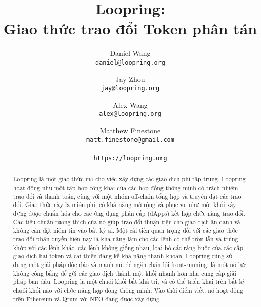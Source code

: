 \documentclass[12pt,a4paper]{article}
\title{\textbf{Loopring:}\\\textbf{Giao thức trao đổi Token phân tán}}
\author{
  Daniel Wang\\
  \texttt{daniel@loopring.org}\\
  \and
  	Jay Zhou\\
  	\texttt{jay@loopring.org}\\
  	\and
  	Alex Wang\\
  	\texttt{alex@loopring.org}\\
  	\and
  	Matthew Finestone\\
  	\texttt{matt.finestone@gmail.com}\\
  \\
  \texttt{https://loopring.org}
 }
\begin{document}
\maketitle

\begin{abstract}
Loopring là một giao thức mở cho việc xây dựng các giao dịch phi tập trung.  Loopring hoạt động như một tập hợp công khai của các hợp đồng thông minh có trách nhiệm trao đổi và thanh toán, cùng với một nhóm off-chain tổng hợp và truyền đạt các trao đổi. Giao thức này là miễn phí, có khả năng mở rộng và phục vụ như một khối xây dựng được chuẩn hóa cho các ứng dụng phân cấp (dApps) kết hợp chức năng trao đổi. Các tiêu chuẩn tương thích của nó giúp trao đổi thuận tiện cho giao dịch ẩn danh và không cần đặt niềm tin vào bất kỳ ai. Một cải tiến quan trọng đối với các giao thức trao đổi phân quyền hiện nay là khả năng làm cho các lệnh có thể trộn lẫn và trùng khớp với các lệnh khác, các lệnh không giống nhau, loại bỏ các ràng buộc của các cặp giao dịch hai token và cải thiện đáng kể khả năng thanh khoản. Loopring cũng sử dụng một giải pháp độc đáo và mạnh mẽ để ngăn chặn lỗi front-running: là một nỗ lực không công bằng để gửi các giao dịch thành một khối nhanh hơn nhà cung cấp giải pháp ban đầu. Loopring là một chuỗi khối bất khả tri, và có thể triển khai trên bất kỳ chuỗi khối nào với chức năng hợp đồng thông minh. Vào thời điểm viết, nó hoạt động trên Ethereum \cite{nakamoto2008bitcoin} \cite{desotocapital} và Qtum \cite{coincheckhack} với NEO \cite{fakevolume} đang được xây dựng.
\end{abstract}
\end{document}
